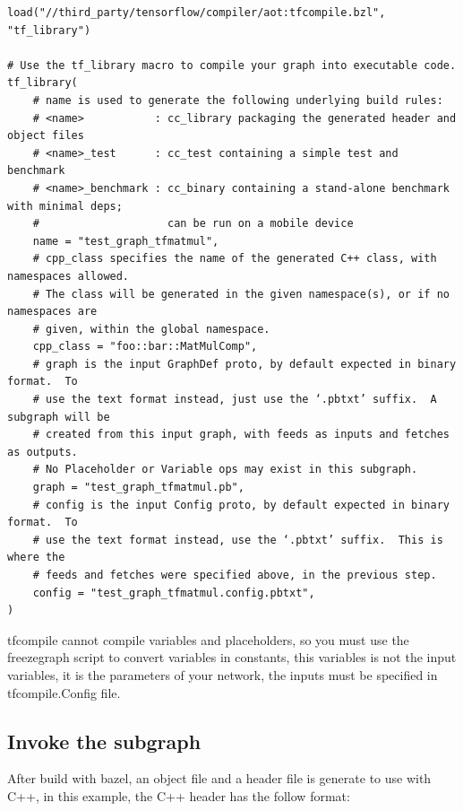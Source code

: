 \documentclass[11pt, fleqn]{article}
\begin{document}
\begin{verbatim}
load("//third_party/tensorflow/compiler/aot:tfcompile.bzl", "tf_library")

# Use the tf_library macro to compile your graph into executable code.
tf_library(
    # name is used to generate the following underlying build rules:
    # <name>           : cc_library packaging the generated header and object files
    # <name>_test      : cc_test containing a simple test and benchmark
    # <name>_benchmark : cc_binary containing a stand-alone benchmark with minimal deps;
    #                    can be run on a mobile device
    name = "test_graph_tfmatmul",
    # cpp_class specifies the name of the generated C++ class, with namespaces allowed.
    # The class will be generated in the given namespace(s), or if no namespaces are
    # given, within the global namespace.
    cpp_class = "foo::bar::MatMulComp",
    # graph is the input GraphDef proto, by default expected in binary format.  To
    # use the text format instead, just use the ‘.pbtxt’ suffix.  A subgraph will be
    # created from this input graph, with feeds as inputs and fetches as outputs.
    # No Placeholder or Variable ops may exist in this subgraph.
    graph = "test_graph_tfmatmul.pb",
    # config is the input Config proto, by default expected in binary format.  To
    # use the text format instead, use the ‘.pbtxt’ suffix.  This is where the
    # feeds and fetches were specified above, in the previous step.
    config = "test_graph_tfmatmul.config.pbtxt",
)
\end{verbatim}

tfcompile cannot compile variables and placeholders, so you must use the freezegraph script to convert variables in constants, this variables is not the input variables, it is the parameters of your network, the inputs must be specified in tfcompile.Config file.

\subsection{Invoke the subgraph}

After build with bazel, an object file and a header file is generate to use with C++, in this example, the C++ header has the follow format:
\end{document}
